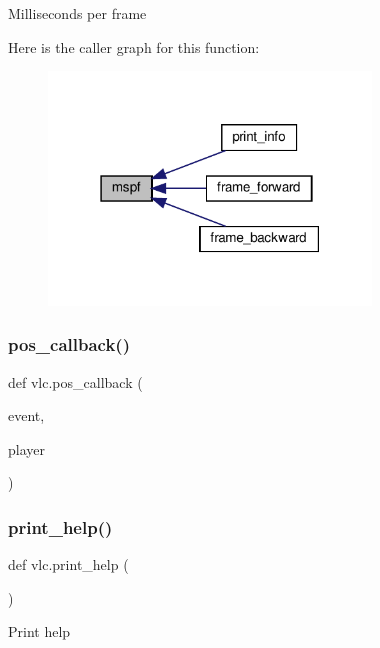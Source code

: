\begin{DoxyVerb}Milliseconds per frame\end{DoxyVerb}
 Here is the caller graph for this function\+:
\nopagebreak
\begin{figure}[H]
\begin{center}
\leavevmode
\includegraphics[width=243pt]{namespacevlc_a9bb9b7542f15491284d77fa0a47e711f_icgraph}
\end{center}
\end{figure}
\mbox{\label{namespacevlc_a78c9205b41c98f83d6b893ec6857ed05}} 
\subsubsection{\texorpdfstring{pos\+\_\+callback()}{pos\_callback()}}
{\footnotesize\ttfamily def vlc.\+pos\+\_\+callback (\begin{DoxyParamCaption}\item[{}]{event,  }\item[{}]{player }\end{DoxyParamCaption})}

\mbox{\label{namespacevlc_a815d75452a68207d96a6cd38f438bd71}} 
\subsubsection{\texorpdfstring{print\+\_\+help()}{print\_help()}}
{\footnotesize\ttfamily def vlc.\+print\+\_\+help (\begin{DoxyParamCaption}{ }\end{DoxyParamCaption})}

\begin{DoxyVerb}Print help\end{DoxyVerb}
 \mbox{\label{namespacevlc_afdc9487efb7cea9b4f2b1da4a075dc76}} 
